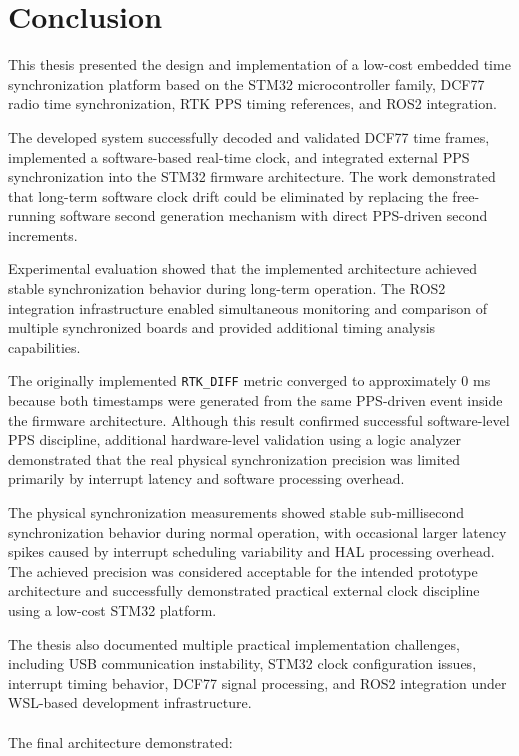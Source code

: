 
\chapter{Conclusion\label{chap:conclusion}}

This thesis presented the design and implementation of a low-cost embedded time synchronization platform based on the STM32 microcontroller family, DCF77 radio time synchronization, RTK PPS timing references, and ROS2 integration.

The developed system successfully decoded and validated DCF77 time frames, implemented a software-based real-time clock, and integrated external PPS synchronization into the STM32 firmware architecture. The work demonstrated that long-term software clock drift could be eliminated by replacing the free-running software second generation mechanism with direct PPS-driven second increments.

Experimental evaluation showed that the implemented architecture achieved stable synchronization behavior during long-term operation. The ROS2 integration infrastructure enabled simultaneous monitoring and comparison of multiple synchronized boards and provided additional timing analysis capabilities.

The originally implemented \texttt{RTK\_DIFF} metric converged to approximately 0 ms because both timestamps were generated from the same PPS-driven event inside the firmware architecture. Although this result confirmed successful software-level PPS discipline, additional hardware-level validation using a logic analyzer demonstrated that the real physical synchronization precision was limited primarily by interrupt latency and software processing overhead.

The physical synchronization measurements showed stable sub-millisecond synchronization behavior during normal operation, with occasional larger latency spikes caused by interrupt scheduling variability and HAL processing overhead. The achieved precision was considered acceptable for the intended prototype architecture and successfully demonstrated practical external clock discipline using a low-cost STM32 platform.

The thesis also documented multiple practical implementation challenges, including USB communication instability, STM32 clock configuration issues, interrupt timing behavior, DCF77 signal processing, and ROS2 integration under WSL-based development infrastructure.
\\
\\
The final architecture demonstrated:

